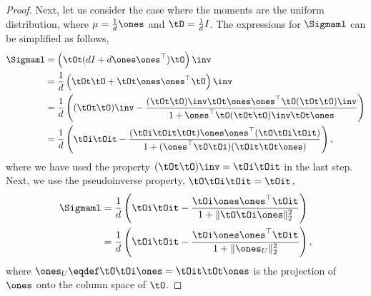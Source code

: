 \begin{proof}
Next, let us consider the case where the moments are the uniform
distribution, where $\mu = \frac{1}{d}\ones$ and $\tD = \frac{1}{d} I$.
The expressions for $\Sigmaml$ can be simplified as
follows,
\begin{align*}
    \Sigmaml 
      &= \left( \tOt(d I + d \ones \ones^\top) \tO \right)\inv \\
      &= \frac{1}{d} \left( \tOt\tO + \tOt\ones \ones^\top \tO \right)\inv \\
      &= \frac{1}{d} \left(
      (\tOt\tO)\inv - \frac{(\tOt\tO)\inv \tOt\ones \ones^\top \tO (\tOt\tO)\inv}
        {1 + \ones^\top \tO (\tOt\tO)\inv \tOt\ones} 
        \right)\\
      &= \frac{1}{d} \left(
      \tOi\tOit - \frac{(\tOi\tOit\tOt) \ones \ones^\top (\tO\tOi\tOit)}
        {1+ (\ones^\top \tO \tOi) (\tOit \tOt\ones)} 
        \right),
      \end{align*}
where we have used the property $(\tOt\tO)\inv = \tOi\tOit$ in the last step.
Next, we use the pseudoinverse property, $\tO\tOi\tOit = \tOit$,
      \begin{align*}
    \Sigmaml 
      &= \frac{1}{d} \left(
      \tOi\tOit - \frac{\tOi \ones \ones^\top \tOit}
        {1+ \|\tO \tOi \ones\|_2^2} 
        \right) \\
      &= \frac{1}{d} \left(
      \tOi\tOit - \frac{\tOi \ones \ones^\top \tOit}
        {1+ \|\ones_U\|_2^2} 
        \right),
\end{align*}
where $\ones_U \eqdef \tO \tOi \ones = \tOit \tOt \ones$ is the projection of $\ones$ onto
the column space of $\tO$. 


\end{proof}
